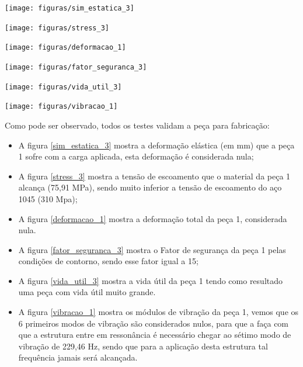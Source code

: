     \begin{center}
        \texttt{[image: figuras/sim\_estatica\_3]}
        \label{sim_estatica_3}
    \end{center}
    
    \begin{center}
        \texttt{[image: figuras/stress\_3]}
        \label{stress_3}
    \end{center}
    
    \begin{center}
        \texttt{[image: figuras/deformacao\_1]}
        \label{deformacao_1}
    \end{center}

    \begin{center}
        \texttt{[image: figuras/fator\_seguranca\_3]}
        \label{fator_seguranca_3}
    \end{center}
    
    \begin{center}
        \texttt{[image: figuras/vida\_util\_3]}
        \label{vida_util_3}
    \end{center}

    \begin{center}
        \texttt{[image: figuras/vibracao\_1]}
        \label{vibracao_1}
    \end{center}    
 
    Como pode ser observado, todos os testes validam a peça para fabricação:
    \begin{itemize}
        \item A figura \ref{sim_estatica_3} mostra a deformação elástica (em mm) que a peça 1 sofre com a carga aplicada, esta deformação é considerada nula;
        \item A figura \ref{stress_3} mostra a tensão de escoamento que o material da peça 1 alcança (75,91 MPa), sendo muito inferior a tensão de escoamento do aço 1045 (310 Mpa);
        \item A figura \ref{deformacao_1} mostra a deformação total da peça 1, considerada nula.
        \item A figura \ref{fator_seguranca_3} mostra o Fator de segurança da peça 1 pelas condições de contorno, sendo esse fator igual a 15;
        \item A figura \ref{vida_util_3} mostra a vida útil da peça 1 tendo como resultado uma peça com vida útil muito grande.
        \item A figura \ref{vibracao_1} mostra os módulos de vibração da peça 1, vemos que os 6 primeiros modos de vibração são considerados nulos, para que a faça com que a estrutura entre em ressonância é necessário chegar ao sétimo modo de vibração de 229,46 Hz, sendo que para a aplicação desta estrutura tal frequência jamais será alcançada.
    \end{itemize}
    

